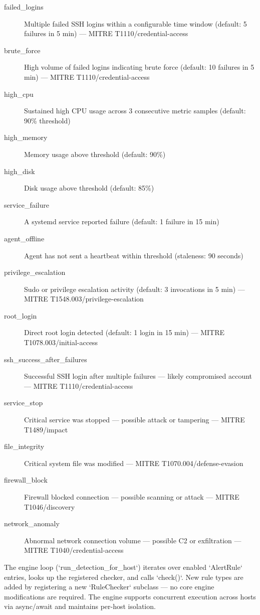 \begin{description}
    \item[failed\_logins] Multiple failed SSH logins within a configurable time window (default: 5 failures in 5 min) — MITRE T1110/credential-access
    \item[brute\_force] High volume of failed logins indicating brute force (default: 10 failures in 5 min) — MITRE T1110/credential-access
    \item[high\_cpu] Sustained high CPU usage across 3 consecutive metric samples (default: 90\% threshold)
    \item[high\_memory] Memory usage above threshold (default: 90\%)
    \item[high\_disk] Disk usage above threshold (default: 85\%)
    \item[service\_failure] A systemd service reported failure (default: 1 failure in 15 min)
    \item[agent\_offline] Agent has not sent a heartbeat within threshold (staleness: 90 seconds)
    \item[privilege\_escalation] Sudo or privilege escalation activity (default: 3 invocations in 5 min) — MITRE T1548.003/privilege-escalation
    \item[root\_login] Direct root login detected (default: 1 login in 15 min) — MITRE T1078.003/initial-access
    \item[ssh\_success\_after\_failures] Successful SSH login after multiple failures — likely compromised account — MITRE T1110/credential-access
    \item[service\_stop] Critical service was stopped — possible attack or tampering — MITRE T1489/impact
    \item[file\_integrity] Critical system file was modified — MITRE T1070.004/defense-evasion
    \item[firewall\_block] Firewall blocked connection — possible scanning or attack — MITRE T1046/discovery
    \item[network\_anomaly] Abnormal network connection volume — possible C2 or exfiltration — MITRE T1040/credential-access
\end{description}

The engine loop (`run_detection_for_host`) iterates over enabled `AlertRule` entries, looks up the registered checker, and calls `check()`. New rule types are added by registering a new `RuleChecker` subclass — no core engine modifications are required. The engine supports concurrent execution across hosts via async/await and maintains per-host isolation.

